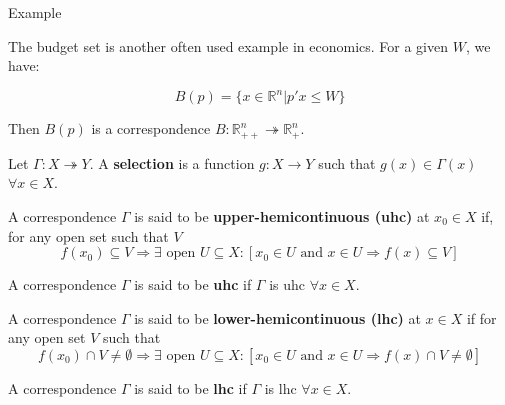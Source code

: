 \documentclass[aspectratio=169]{beamer}
\begin{document}
\begin{frame}{Example}

    The budget set is another often used example in economics. For a given $W$, we have:

    \[B(p) = \{x\in\mathds{R}^n | p'x\leq W\}\]

    Then $B(p)$ is a correspondence $B: \mathds{R}^n_{++}\twoheadrightarrow\mathds{R}^n_+$.
    
\end{frame}

\begin{frame}
    \begin{definition}
        Let $\Gamma:X\twoheadrightarrow Y$. A \textbf{selection} is a function $g:X\rightarrow Y$ such that $g(x)\in \Gamma(x)$ $\forall x\in X$.
    \end{definition}
\end{frame}

\begin{frame}
    \begin{definition}
        A correspondence $\Gamma$ is said to be \textbf{upper-hemicontinuous (uhc)} at $x_0\in X$ if, for any open set such that $V$ \[f(x_0)\subseteq V \Rightarrow \exists \text{ open } U\subseteq X:[x_0\in U \text{ and } x\in U\Rightarrow f(x)\subseteq V] \]
    \end{definition}

    \pause

    \begin{definition}
        A correspondence $\Gamma$ is said to be \textbf{uhc} if $\Gamma$ is uhc $\forall x\in X$.
    \end{definition}
\end{frame}

\begin{frame}
    \begin{definition}
        A correspondence $\Gamma$ is said to be \textbf{lower-hemicontinuous (lhc)} at $x\in X$ if for any open set $V$ such that
        \[f(x_0)\cap V \neq\emptyset\Rightarrow \exists \text{ open } U\subseteq X: [x_0\in U\text{ and }x\in U\Rightarrow f(x)\cap V\neq \emptyset]\]
        
    \end{definition}

    \begin{definition}
        A correspondence $\Gamma$ is said to be \textbf{lhc} if $\Gamma$ is lhc $\forall x\in X$.
    \end{definition}
\end{frame}
\end{document}
